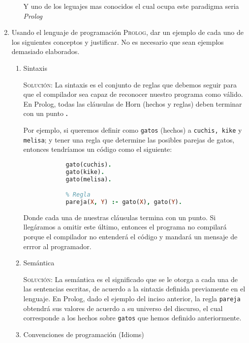 \documentclass[letterpaper,11pt]{article}
\begin{document}
\begin{enumerate}
\begin{enumerate}
        Y uno de los leguajes mas conocidos el cual ocupa este paradigma seria \textit{Prolog}
    \end{enumerate}

    \item Usando el lenguaje de programación \textsc{Prolog}, dar un ejemplo de 
    cada uno de los siguientes conceptos y justificar. No es necesario que sean 
    ejemplos demasiado elaborados.
    \begin{enumerate}
        \item Sintaxis

        \textsc{Solución:} La sintaxis es el conjunto de reglas que debemos 
        seguir para que el compilador sea capaz de reconocer nuestro programa 
        como válido. En Prolog, todas las cláusulas de Horn (hechos y reglas) 
        deben terminar con un punto \textbf{.} 

        Por ejemplo, si queremos definir como \texttt{gatos} (hechos) a 
        \texttt{cuchis, kike} y \texttt{melisa}; y tener una regla que 
        determine las posibles parejas de gatos, entonces tendríamos un código 
        como el siguiente:
        \begin{lstlisting}[language=Prolog]
            % Hechos
            gato(cuchis).
            gato(kike).
            gato(melisa).

            % Regla
            pareja(X, Y) :- gato(X), gato(Y).
        \end{lstlisting}
        
        Donde cada una de nuestras cláusulas termina con un punto. Si llegáramos
        a omitir este último, entonces el programa no compilará porque el 
        compilador no entenderá el código y mandará un mensaje de errror al 
        programador.

        \item Semántica

        \textsc{Solución:} La semántica es el significado que se le otorga a 
        cada una de las sentencias escritas, de acuerdo a la sintaxis definida 
        previamente en el lenguaje. En Prolog, dado el ejemplo del inciso 
        anterior, la regla \texttt{pareja} obtendrá sus valores de acuerdo a su 
        universo del discurso, el cual corresponde a los hechos sobre 
        \texttt{gatos} que hemos definido anteriormente. 

        \item Convenciones de programación (Idioms)


\end{enumerate}
\end{enumerate}
\end{document}
